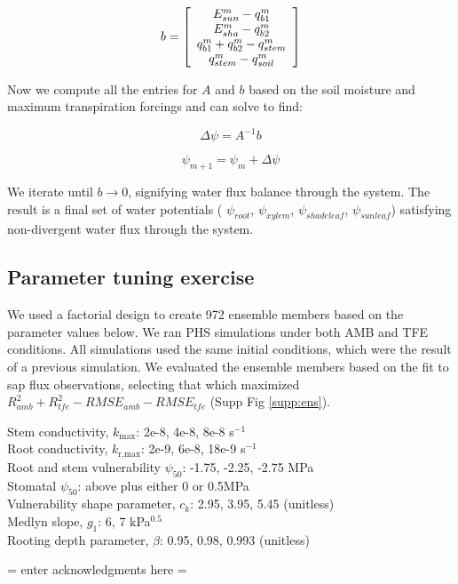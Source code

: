 \documentclass[draft,linenumbers]{agujournal}
\begin{document}
   \begin{linenomath*} \begin{equation} 
   b=
   \left[ \begin {array}{c}
   E_{sun}^{m}-q_{b1}^{m} \cr
   E_{sha}^{m}-q_{b2}^{m} \cr
   q_{b1}^{m}+q_{b2}^{m}-q_{stem}^{m} \cr
   q_{stem}^{m}-q_{soil}^{m}
   \end {array} \right]
   \end{equation} \end{linenomath*}

Now we compute all the entries for $A$ and $b$ based on the soil moisture and maximum transpiration forcings and can solve to find:

   \begin{linenomath*} \begin{equation} 
   \Delta\psi=A^{-1}b
   \end{equation} \end{linenomath*}

   \begin{linenomath*} \begin{equation} 
   \psi_{m+1}=\psi_m+\Delta\psi
   \end{equation} \end{linenomath*}

We iterate until $b\to 0$, signifying water flux balance through the system. The result is a final set of water potentials ( $\psi_{root}$, $\psi_{xylem}$, $\psi_{shadeleaf}$, $\psi_{sunleaf}$) satisfying non-divergent water flux through the system. 

\subsection{Parameter tuning exercise}
\label{ens}

We used a factorial design to create 972 ensemble members based on the parameter values below.
We ran PHS simulations under both AMB and TFE conditions.
All simulations used the same initial conditions, which were the result of a previous simulation.
We evaluated the ensemble members based on the fit to sap flux observations, selecting that which
 maximized $R^2_{amb}+R^2_{tfe}-RMSE_{amb}-RMSE_{tfe}$ (Supp Fig \ref{supp:ens}).

Stem conductivity, $k_{\text{max}}$: 2e-8, 4e-8, 8e-8 s$^{-1}$ \\
Root conductivity, $k_{\text{r,max}}$: 2e-9, 6e-8, 18e-9 s$^{-1}$ \\
Root and stem vulnerability $\psi_{50}$: -1.75, -2.25, -2.75 MPa \\
Stomatal $\psi_{50}$: above plus either 0 or 0.5MPa \\
Vulnerability shape parameter, $c_k$: 2.95, 3.95, 5.45 (unitless) \\
Medlyn slope, $g_1$: 6, 7 kPa$^{0.5}$ \\
Rooting depth parameter, $\beta$: 0.95, 0.98, 0.993 (unitless) 



\acknowledgments
 = enter acknowledgments here =

\nocite{*} 



\listofchanges
\end{document}
